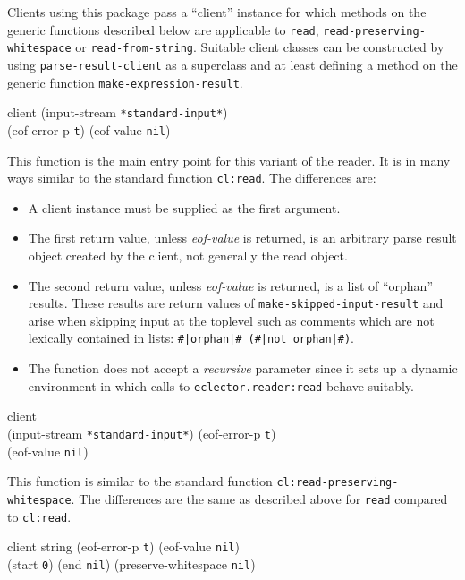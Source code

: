 Clients using this package pass a ``client'' instance for which
methods on the generic functions described below are applicable to
\texttt{read}, \texttt{read-preserving-whitespace} or
\texttt{read-from-string}.  Suitable client classes can be constructed
by using \texttt{parse-result-client} as a superclass and at least
defining a method on the generic function
\texttt{make-expression-result}.

 {client \optional (input-stream \texttt{*standard-input*})\\
  (eof-error-p \texttt{t})
  (eof-value \texttt{nil})}

This function is the main entry point for this variant of the reader.
It is in many ways similar to the standard \commonlisp{} function
\texttt{cl:read}.  The differences are:

\begin{itemize}
\item A client instance must be supplied as the first argument.
\item The first return value, unless \textit{eof-value} is returned,
  is an arbitrary parse result object created by the client, not
  generally the read object.
\item The second return value, unless \textit{eof-value} is returned,
  is a list of ``orphan'' results.  These results are return values of
  \texttt{make-skipped-input-result} and arise when skipping input at
  the toplevel such as comments which are not lexically contained in
  lists: \texttt{\#|orphan|\# (\#|not orphan|\#)}.
\item The function does not accept a \textit{recursive} parameter
  since it sets up a dynamic environment in which calls to
  \texttt{eclector.reader:read} behave suitably.
\end{itemize}

 {client \\
  \optional (input-stream \texttt{*standard-input*})
  (eof-error-p \texttt{t})\\
  (eof-value \texttt{nil})}

This function is similar to the standard \commonlisp{} function
\texttt{cl:read-preserving-whitespace}.  The differences are the same
as described above for \texttt{read} compared to \texttt{cl:read}.

 {client string \optional
  (eof-error-p \texttt{t})
  (eof-value \texttt{nil})\\
  \key
  (start \texttt{0})
  (end \texttt{nil})
  (preserve-whitespace \texttt{nil})}

